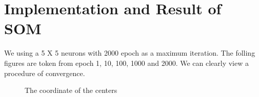\documentclass[a4paper, 11pt]{article} %
\begin{document}

\section*{Implementation and Result of SOM}
We using a 5 X 5 neurons with 2000 epoch as a maximum iteration.
The folling figures are token from epoch 1, 10, 100, 1000 and 2000. We can clearly view a procedure of convergence.

\begin{figure}[h]
	\centering 
	\caption{The coordinate of the centers}
	\label{fig:subfig}
\end{figure}

\end{document}

